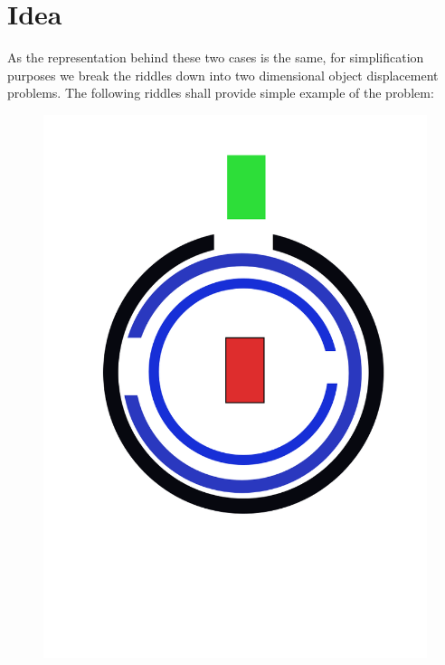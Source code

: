 \section{Idea}
\label{sec:Idea}
As the representation behind these two cases is the same, for simplification purposes we break the riddles down into two dimensional object displacement problems. The following riddles shall provide simple example of the problem:\\

\begin{figure}[h]
\includegraphics[scale=0.1]{circleRiddle.png}

\end{figure}
